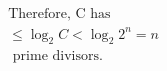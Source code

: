 \documentclass[preview]{standalone}
\begin{document}
\begin{align*}
\
                       \text{Therefore, C has } \\ \
                       \leq \log_2 C < \log_2 2^n = n \\ \
                       \text{ prime divisors.}
\end{align*}
\end{document}
